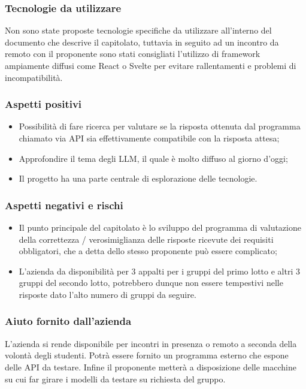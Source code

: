 \documentclass[10pt]{article}
\begin{document}
\subsubsection{Tecnologie da utilizzare}
Non sono state proposte tecnologie specifiche da utilizzare all'interno del documento che descrive il capitolato, tuttavia in seguito ad un incontro da remoto con il proponente sono stati consigliati l'utilizzo di framework ampiamente diffusi come React o Svelte per evitare rallentamenti e problemi di incompatibilità.
\subsubsection{Aspetti positivi}
\begin{itemize}
    \item Possibilità di fare ricerca per valutare se la risposta ottenuta dal programma chiamato via API sia effettivamente compatibile con la risposta attesa;
    \item Approfondire il tema degli LLM, il quale è molto diffuso al giorno d'oggi;
    \item Il progetto ha una parte centrale di esplorazione delle tecnologie.
\end{itemize}
\subsubsection{Aspetti negativi e rischi}
\begin{itemize}
    \item Il punto principale del capitolato è lo sviluppo del programma di valutazione della correttezza / verosimiglianza delle risposte ricevute dei requisiti obbligatori, che a detta dello stesso proponente può essere complicato;
    \item L'azienda da disponibilità per 3 appalti per i gruppi del primo lotto e altri 3 gruppi del secondo lotto, potrebbero dunque non essere tempestivi nelle risposte dato l'alto numero di gruppi da seguire.
\end{itemize}
\subsubsection{Aiuto fornito dall'azienda}
L'azienda si rende disponibile per incontri in presenza o remoto a seconda della volontà degli studenti. Potrà essere fornito un programma esterno che espone delle API da testare. Infine il proponente metterà a disposizione delle macchine su cui far girare i modelli da testare su richiesta del gruppo.
\end{document}
